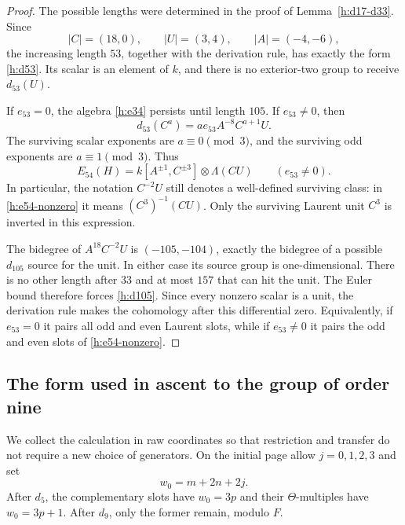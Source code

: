 \begin{proof}
The possible lengths were determined in the proof of
Lemma~\ref{h:d17-d33}. Since
\[
 |C|=(18,0),\qquad |U|=(3,4),\qquad |A|=(-4,-6),
\]
the increasing length $53$, together with the derivation rule, has
exactly the form \eqref{h:d53}. Its scalar is an element of $k$, and
there is no exterior-two group to receive $d_{53}(U)$.

If $e_{53}=0$, the algebra \eqref{h:e34} persists until length
$105$. If $e_{53}\ne0$, then
\[
 d_{53}(C^a)=a e_{53}A^{-8}C^{a+1}U.
\]
The surviving scalar exponents are $a\equiv0\pmod3$, and the
surviving odd exponents are $a\equiv1\pmod3$. Thus
\begin{equation}
 \label{h:e54-nonzero}
 E_{54}(H)=k[A^{\pm1},C^{\pm3}]\otimes\Lambda(CU)
 \qquad(e_{53}\ne0).
\end{equation}
In particular, the notation $C^{-2}U$ still denotes a well-defined
surviving class: in \eqref{h:e54-nonzero} it means
$(C^3)^{-1}(CU)$. Only the surviving Laurent unit $C^3$ is inverted
in this expression.

The bidegree of $A^{18}C^{-2}U$ is $(-105,-104)$, exactly the
bidegree of a possible $d_{105}$ source for the unit. In either case
its source group is one-dimensional. There is no other length after
$33$ and at most $157$ that can hit the unit. The Euler bound
therefore forces \eqref{h:d105}. Since every nonzero scalar is a unit,
the derivation rule makes the cohomology after this differential zero.
Equivalently, if $e_{53}=0$ it pairs all odd and even Laurent slots,
while if $e_{53}\ne0$ it pairs the odd and even slots of
\eqref{h:e54-nonzero}.
\end{proof}

\subsection{The form used in ascent to the group of order nine}

We collect the calculation in raw coordinates so that restriction and
transfer do not require a new choice of generators. On the initial
page allow $j=0,1,2,3$ and set
\begin{equation}
 \label{h:w-coordinate}
 w_0=m+2n+2j.
\end{equation}
After $d_5$, the complementary slots have $w_0=3p$ and their
$\Theta$-multiples have $w_0=3p+1$. After $d_9$, only the former
remain, modulo $F$.

